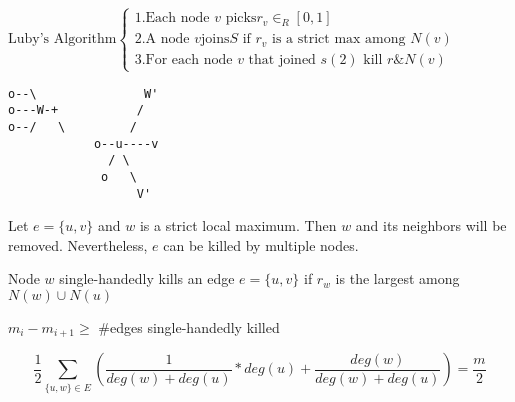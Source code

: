 \documentclass[12pt]{article}
\begin{document}
$
\text{Luby's Algorithm}\left\{
\begin{array}{ll}
1.\text{Each node }v \text{ picks} r_v \in_R[0,1]\\
2.\text{A node }v \text{joins} S \text{ if } r_v \text{ is a strict max among } N(v)\\
3.\text{For each node } v \text{ that joined } s (2) \text{ kill } r \& N(v) 
\end{array}
\right.
$
\newpage
\begin{verbatim}
o--\               W'
o---W-+           /
o--/   \         /
	        o--u----v
	          / \
	         o   \
	              V'
\end{verbatim}

Let $e=\{u,v\}$ and $w$ is a strict local maximum. Then $w$ and its neighbors will be removed. Nevertheless, $e$ can be killed by multiple nodes. 

Node $w$ single-handedly kills an edge $e=\{u,v\}$ if $r_w$ is the largest among $N(w) \cup N(u)$
\begin{center}
$m_i-m_{i+1} \geq$ \#edges single-handedly killed
\end{center}
$$
\frac1{2}\sum_{\{u,w\} \in E}\left(\frac{1}{deg(w)+deg(u)}*deg(u)+\frac{deg(w)}{deg(w)+deg(u)}\right) = \frac{m}2
$$
\end{document}
